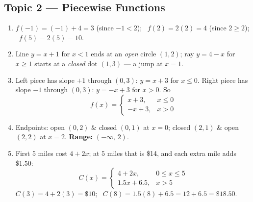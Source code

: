 \documentclass[11pt]{article}
\newcommand{\axesbg}{%
  \draw[step=1,gray!25,very thin] (-5,-5) grid (5,5);
  \draw[->,gray!70] (-5.3,0)--(5.3,0) node[right,black]{\scriptsize$x$};
  \draw[->,gray!70] (0,-5.3)--(0,5.3) node[above,black]{\scriptsize$y$};
  \foreach \i in {-4,-2,2,4}{%
    \draw (\i,0.08)--(\i,-0.08) node[below,black]{\tiny$\i$};
    \draw (0.08,\i)--(-0.08,\i) node[left,black]{\tiny$\i$};}}
\newcommand{\opendot}[2]{\draw[FangBlue,thick,fill=white] (#1,#2) circle (0.13);}
\newcommand{\closeddot}[2]{\fill[FangBlue] (#1,#2) circle (0.13);}
\begin{document}
\subsection*{\color{FangBlue}Topic 2 --- Piecewise Functions}
\begin{enumerate}[leftmargin=2em,itemsep=8pt]
  \item $f(-1)=(-1)+4=\boxed{3}$ (since $-1<2$); \ $f(2)=2(2)=\boxed{4}$ (since $2\ge 2$);
        \ $f(5)=2(5)=\boxed{10}.$
  \item Line $y=x+1$ for $x<1$ ends at an \emph{open} circle $(1,2)$; ray $y=4-x$ for $x\ge 1$ starts at a
        \emph{closed} dot $(1,3)$ — a jump at $x=1$.\\[3pt]
  \item Left piece has slope $+1$ through $(0,3)$: $y = x+3$ for $x\le 0$.
        Right piece has slope $-1$ through $(0,3)$: $y = -x+3$ for $x>0$. So
        \[
          f(x)=\begin{cases}x+3, & x\le 0\\ -x+3, & x>0\end{cases}
        \]
  \item Endpoints: open $(0,2)$ \& closed $(0,1)$ at $x=0$; closed $(2,1)$ \& open $(2,2)$ at $x=2$.
        \textbf{Range: } $(-\infty,\,2)$.\\[3pt]
  \item First $5$ miles cost $4 + 2x$; at $5$ miles that is \$14, and each extra mile adds \$1.50:
        \[
          C(x)=\begin{cases}4 + 2x, & 0\le x\le 5\\[2pt] 1.5x + 6.5, & x > 5\end{cases}
        \]
        $C(3) = 4 + 2(3) = \boxed{\$10}$; \ $C(8) = 1.5(8) + 6.5 = 12 + 6.5 = \boxed{\$18.50}.$
\end{enumerate}
\end{document}
